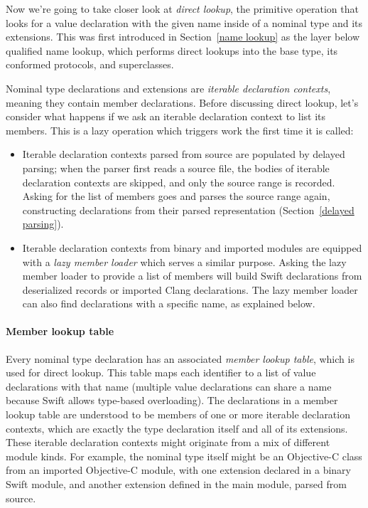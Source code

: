 \documentclass[../generics]{subfiles}
\begin{document}
Now we're going to take closer look at \emph{direct lookup}, the primitive operation that looks for a value declaration with the given name inside of a nominal type and its extensions. This was first introduced in Section~\ref{name lookup} as the layer below qualified name lookup, which performs direct lookups into the base type, its conformed protocols, and superclasses.

Nominal type declarations and extensions are \emph{iterable declaration contexts}, meaning they contain member declarations. Before discussing direct lookup, let's consider what happens if we ask an iterable declaration context to list its members. This is a lazy operation which triggers work the first time it is called:
\begin{itemize}
\item Iterable declaration contexts parsed from source are populated by delayed parsing; when the parser first reads a source file, the bodies of iterable declaration contexts are skipped, and only the source range is recorded. Asking for the list of members goes and parses the source range again, constructing declarations from their parsed representation (Section~\ref{delayed parsing}).
\item Iterable declaration contexts from binary and imported modules are equipped with a \emph{lazy member loader} which serves a similar purpose. Asking the lazy member loader to provide a list of members will build Swift declarations from deserialized records or imported Clang declarations. The lazy member loader can also find declarations with a specific name, as explained below.
\end{itemize}

\paragraph{Member lookup table}
Every nominal type declaration has an associated \emph{member lookup table}, which is used for direct lookup. This table maps each identifier to a list of value declarations with that name (multiple value declarations can share a name because Swift allows type-based overloading). The declarations in a member lookup table are understood to be members of one or more iterable declaration contexts, which are exactly the type declaration itself and all of its extensions. These iterable declaration contexts might originate from a mix of different module kinds. For example, the nominal type itself might be an Objective-C class from an imported Objective-C module, with one extension declared in a binary Swift module, and another extension defined in the main module, parsed from source. 
\end{document}
